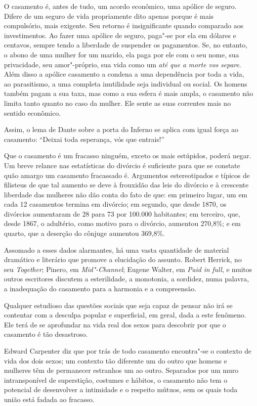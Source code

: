 O casamento é, antes de tudo, um acordo econômico, uma apólice de
seguro. Difere de um seguro de vida propriamente dito apenas porque é
mais compulsório, mais exigente. Seu retorno é insignificante quando
comparado aos investimentos. Ao fazer uma apólice de seguro, paga"-se por
ela em dólares e centavos, sempre tendo a liberdade de suspender os
pagamentos. Se, no entanto, o abono de uma mulher for um marido, ela
paga por ele com o seu nome, sua privacidade, seu amor"-próprio, sua vida
como um \textit{até que a morte vos separe}. Além disso a apólice
casamento a condena a uma dependência por toda a vida, ao parasitismo, a
uma completa inutilidade seja individual ou social. Os homens também
pagam a sua taxa, mas como a sua esfera é mais ampla, o casamento não
limita tanto quanto no caso da mulher. Ele sente as suas correntes mais
no sentido econômico.

Assim, o lema de Dante sobre a porta do Inferno se aplica com igual força
ao casamento: ``Deixai toda esperança, vós que entrais!''

Que o casamento é um fracasso ninguém, exceto os mais
estúpidos, poderá negar. Um breve relance nas estatísticas do divórcio é
suficiente para que se constate quão amargo um casamento fracassado é. Argumentos
estereotipados e típicos de filisteus de que tal aumento se deve à frouxidão
das leis do divórcio e à crescente liberdade das mulheres não dão conta
do fato de que: em primeiro lugar, um em cada 12 casamentos termina em
divórcio; em segundo, que desde 1870, os divórcios aumentaram de 28 para
73 por 100.000 habitantes; em terceiro, que, desde 1867, o adultério,
como motivo para o divórcio, aumentou 270,8\%; e em quarto, que a
deserção do cônjuge aumentou 369,8\%.

Assomado a esses dados alarmantes, há uma vasta quantidade de material
dramático e literário que promove a elucidação do assunto. Robert
Herrick, no seu \textit{Together}; Pinero, em \textit{Mid"-Channel}; Eugene
Walter, em \textit{Paid in full}, e muitos outros escritores discutem a
esterilidade, a monotonia, a sordidez, numa palavra, a inadequação do
casamento para a harmonia e a compreensão.

Qualquer estudioso das questões sociais que seja capaz de pensar não irá
se contentar com a desculpa popular e superficial, em geral, dada a este fenômeno. Ele
terá de se aprofundar na vida real dos sexos para descobrir por que o
casamento é tão desastroso.

Edward Carpenter diz que por trás de todo casamento encontra"-se o
contexto de vida dos dois sexos; um contexto tão diferente um do outro
que homens e mulheres têm de permanecer estranhos um ao outro.
Separados por um muro intransponível de superstição, costumes e hábitos,
o casamento não tem o potencial de desenvolver a intimidade e o
respeito mútuos, sem os quais toda união está fadada ao fracasso.

